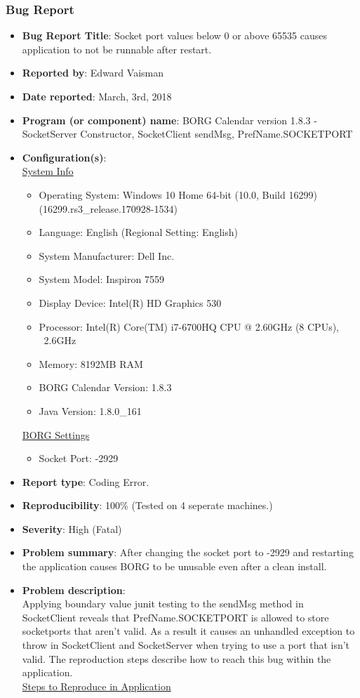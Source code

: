\documentclass[fontsize=12pt,paper=letter,twoside]{scrartcl}
\begin{document}
\begin{itemize}
\subsubsection{Bug Report}
\begin{itemize}
\item \textbf{Bug Report Title}: Socket port values below 0 or above 65535 causes application to not be runnable after restart.
\item \textbf{Reported by}: Edward Vaisman
\item \textbf{Date reported}: March, 3rd, 2018
\item \textbf{Program (or component) name}: BORG Calendar version 1.8.3 - SocketServer Constructor, SocketClient sendMsg,  PrefName.SOCKETPORT
\item \textbf{Configuration(s)}:\\
\underline{System Info}
\begin{itemize}
\item{Operating System: Windows 10 Home 64-bit (10.0, Build 16299) (16299.rs3\_release.170928-1534)}
\item {Language: English (Regional Setting: English)}
\item {System Manufacturer: Dell Inc.}
\item {System Model: Inspiron 7559}
\item {Display Device: Intel(R) HD Graphics 530}
\item {Processor: Intel(R) Core(TM) i7-6700HQ CPU @ 2.60GHz (8 CPUs), ~2.6GHz }
\item {Memory: 8192MB RAM}
\item {BORG Calendar Version: 1.8.3}
\item {Java Version: 1.8.0\_161}
\end{itemize}
\underline{BORG Settings}
\begin{itemize}
\item{Socket Port: -2929}
\end{itemize}
\item \textbf{Report type}: Coding Error.
\item \textbf{Reproducibility}: 100\% (Tested on 4 seperate machines.)
\item \textbf{Severity}: High (Fatal)
\item \textbf{Problem summary}: After changing the socket port to -2929 and restarting the application causes BORG to be unusable even after a clean install.
\item \textbf{Problem description}:\\
Applying boundary value junit testing to the sendMsg method in SocketClient reveals that PrefName.SOCKETPORT is allowed to store socketports that aren't valid. As a result it causes an unhandled exception to throw in SocketClient and SocketServer when trying to use a port that isn't valid. The reproduction steps describe how to reach this bug within the application. \\
\underline{Steps to Reproduce in Application}
\begin{enumerate}


\end{enumerate}
\end{itemize}
\end{itemize}
\end{document}
